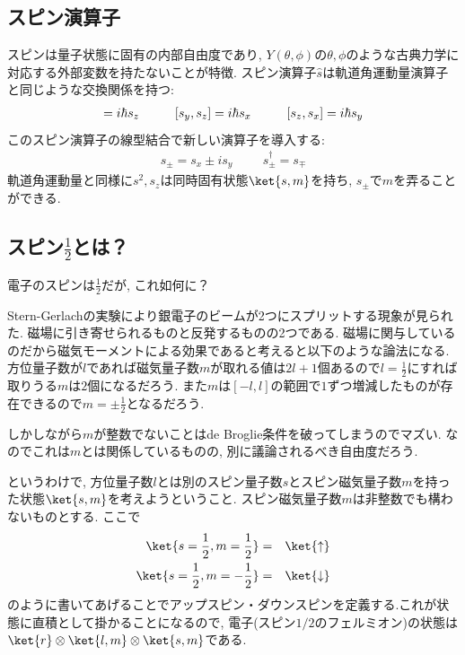 \documentclass[10.5pt,a4paper]{jreport}
\begin{document}
\subsection{スピン演算子}
スピンは量子状態に固有の内部自由度であり, $Y(\theta, \phi)$の$\theta, \phi$のような古典力学に対応する外部変数を持たないことが特徴. スピン演算子$\hat{s}$は軌道角運動量演算子と同じような交換関係を持つ:
\begin{eqnarray}
  [s_x, s_y] = i\hbar s_z\hspace{1.0cm}[s_y, s_z] = i\hbar s_x\hspace{1.0cm}[s_z, s_x] = i\hbar s_y
\end{eqnarray}
このスピン演算子の線型結合で新しい演算子を導入する:
\begin{eqnarray}
  s_\pm = s_x \pm is_y\hspace{1cm}s^\dagger_\pm = s_\mp
\end{eqnarray}
軌道角運動量と同様に$s^2, s_z$は同時固有状態$\ket{s, m}$を持ち, $s_\pm$で$m$を弄ることができる.
\subsection{スピン$\frac{1}{2}$とは？}
電子のスピンは$\frac{1}{2}$だが, これ如何に？

Stern-Gerlachの実験により銀電子のビームが2つにスプリットする現象が見られた. 磁場に引き寄せられるものと反発するものの2つである. 磁場に関与しているのだから磁気モーメントによる効果であると考えると以下のような論法になる.\\

方位量子数が$l$であれば磁気量子数$m$が取れる値は$2l + 1$個あるので$l = \frac{1}{2}$にすれば取りうる$m$は$2$個になるだろう. また$m$は$[-l, l]$の範囲で$1$ずつ増減したものが存在できるので$m = \pm\frac{1}{2}$となるだろう.

しかしながら$m$が整数でないことはde Broglie条件を破ってしまうのでマズい. なのでこれは$m$とは関係しているものの, 別に議論されるべき自由度だろう.

というわけで, 方位量子数$l$とは別のスピン量子数$s$とスピン磁気量子数$m$を持った状態$\ket{s, m}$を考えようということ. スピン磁気量子数$m$は非整数でも構わないものとする. ここで
\begin{eqnarray}
  \ket{s = \frac{1}{2}, m = \frac{1}{2}} &=& \ket{\uparrow}\\
  \ket{s = \frac{1}{2}, m = -\frac{1}{2}} &=& \ket{\downarrow}
\end{eqnarray}
のように書いてあげることでアップスピン・ダウンスピンを定義する.これが状態に直積として掛かることになるので, 電子(スピン$1/2$のフェルミオン)の状態は$\ket{r}\otimes\ket{l, m}\otimes\ket{s, m}$である.
\end{document}
